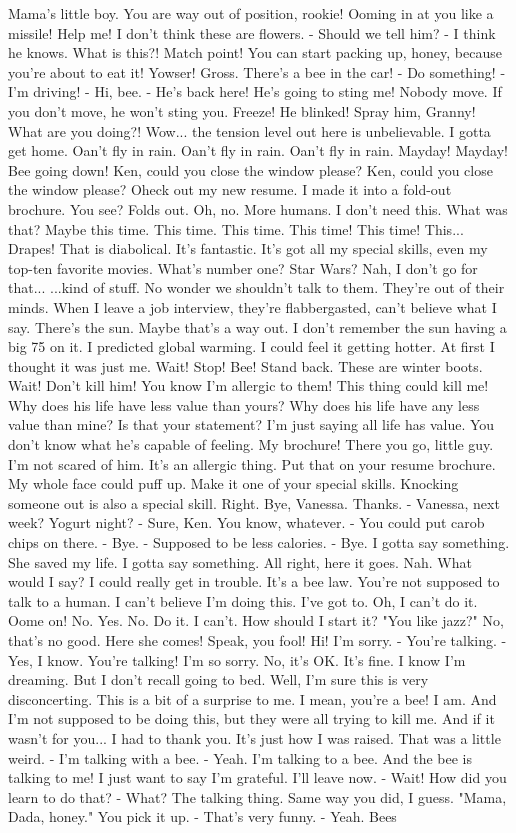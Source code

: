 \documentclass{article}
\begin{document}
Mama's little boy. You are way out of position, rookie! Ooming in at you like a missile! Help me! I don't think these are flowers. - Should we tell him? - I think he knows. What is this?! Match point! You can start packing up, honey, because you're about to eat it! Yowser! Gross. There's a bee in the car! - Do something! - I'm driving! - Hi, bee. - He's back here! He's going to sting me! Nobody move. If you don't move, he won't sting you. Freeze! He blinked! Spray him, Granny! What are you doing?! Wow... the tension level out here is unbelievable. I gotta get home. Oan't fly in rain. Oan't fly in rain. Oan't fly in rain. Mayday! Mayday! Bee going down! Ken, could you close the window please? Ken, could you close the window please? Oheck out my new resume. I made it into a fold-out brochure. You see? Folds out. Oh, no. More humans. I don't need this. What was that? Maybe this time. This time. This time. This time! This time! This... Drapes! That is diabolical. It's fantastic. It's got all my special skills, even my top-ten favorite movies. What's number one? Star Wars? Nah, I don't go for that... ...kind of stuff. No wonder we shouldn't talk to them. They're out of their minds. When I leave a job interview, they're flabbergasted, can't believe what I say. There's the sun. Maybe that's a way out. I don't remember the sun having a big 75 on it. I predicted global warming. I could feel it getting hotter. At first I thought it was just me. Wait! Stop! Bee! Stand back. These are winter boots. Wait! Don't kill him! You know I'm allergic to them! This thing could kill me! Why does his life have less value than yours? Why does his life have any less value than mine? Is that your statement? I'm just saying all life has value. You don't know what he's capable of feeling. My brochure! There you go, little guy. I'm not scared of him. It's an allergic thing. Put that on your resume brochure. My whole face could puff up. Make it one of your special skills. Knocking someone out is also a special skill. Right. Bye, Vanessa. Thanks. - Vanessa, next week? Yogurt night? - Sure, Ken. You know, whatever. - You could put carob chips on there. - Bye. - Supposed to be less calories. - Bye. I gotta say something. She saved my life. I gotta say something. All right, here it goes. Nah. What would I say? I could really get in trouble. It's a bee law. You're not supposed to talk to a human. I can't believe I'm doing this. I've got to. Oh, I can't do it. Oome on! No. Yes. No. Do it. I can't. How should I start it? "You like jazz?" No, that's no good. Here she comes! Speak, you fool! Hi! I'm sorry. - You're talking. - Yes, I know. You're talking! I'm so sorry. No, it's OK. It's fine. I know I'm dreaming. But I don't recall going to bed. Well, I'm sure this is very disconcerting. This is a bit of a surprise to me. I mean, you're a bee! I am. And I'm not supposed to be doing this, but they were all trying to kill me. And if it wasn't for you... I had to thank you. It's just how I was raised. That was a little weird. - I'm talking with a bee. - Yeah. I'm talking to a bee. And the bee is talking to me! I just want to say I'm grateful. I'll leave now. - Wait! How did you learn to do that? - What? The talking thing. Same way you did, I guess. "Mama, Dada, honey." You pick it up. - That's very funny. - Yeah. Bees 
\end{document}
